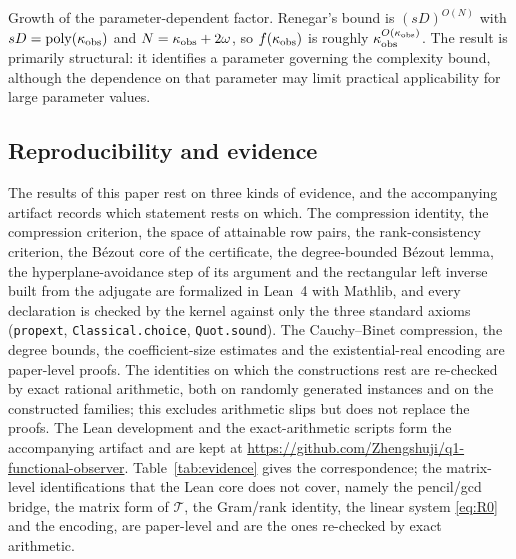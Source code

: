 \documentclass[journal]{IEEEtran}
\theoremstyle{plainn}
\theoremstyle{remark}
\begin{document}
Growth of the parameter-dependent factor. Renegar's bound is $(sD)^{O(N)}$ with $sD=\operatorname{poly}(\kappa_{\rm obs})$ and $N=\kappa_{\rm obs}+2\omega$, so $f(\kappa_{\rm obs})$ is roughly $\kappa_{\rm obs}^{O(\kappa_{\rm obs})}$. The result is primarily structural: it identifies a parameter governing the complexity bound, although the dependence on that parameter may limit practical applicability for large parameter values.

\subsection{Reproducibility and evidence}\label{sec:repro}

The results of this paper rest on three kinds of evidence, and the accompanying artifact records which
statement rests on which. The compression identity, the compression criterion, the space of attainable row
pairs, the rank-consistency criterion, the B\'ezout core of the certificate, the
degree-bounded B\'ezout lemma, the hyperplane-avoidance step of its argument and the
rectangular left inverse built from the adjugate are formalized
in Lean~4 with Mathlib, and every declaration is checked by the kernel against only the three standard axioms
(\texttt{propext}, \texttt{Classical.choice}, \texttt{Quot.sound}). The Cauchy--Binet compression, the
degree bounds, the coefficient-size estimates and the existential-real encoding are paper-level
proofs. The identities on which the constructions rest are re-checked by exact rational arithmetic,
both on randomly generated instances and on the constructed families; this excludes arithmetic slips
but does not replace the proofs. The Lean development and the exact-arithmetic scripts form the
accompanying artifact and are kept at
\url{https://github.com/Zhengshuji/q1-functional-observer}. Table~\ref{tab:evidence} gives the
correspondence; the matrix-level identifications that the Lean core does not cover, namely the
pencil/gcd bridge, the matrix form of $\mathcal T$, the Gram/rank identity, the linear system
\eqref{eq:R0} and the encoding, are paper-level and are the ones re-checked by exact arithmetic.
\end{document}
